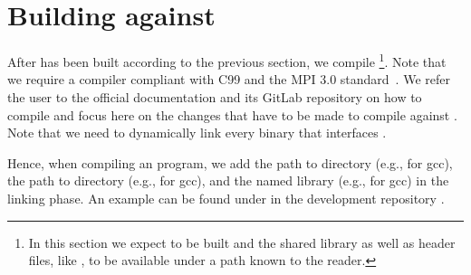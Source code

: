 
\section{Building \openqxd against \quda}
\label{sec:building:openqxd}

After \quda has been built according to the previous section, we compile \openqxd\footnote{In this section we expect \quda to be built and the shared library  as well as header files, like , to be available under a path known to the reader.}.
Note that we require a compiler compliant with C99 and the MPI 3.0 standard~\cite{standard:mpi-3.0}.
We refer the user to the official \openqxd documentation \cite{openqxd} and its GitLab repository \cite{gitlab:openqxd} on how to compile and focus here on the changes that have to be made to compile against \quda.
Note that we need to dynamically link every \openqxd binary that interfaces \quda.


Hence, when compiling an \openqxd program, we add the path to \qudas {} directory (e.g.,  for gcc), the path to \qudas {} directory (e.g.,  for gcc), and the named library (e.g.,  for gcc) in the linking phase. An example  can be found under  in the \openqxd development repository \cite{gitlab:openqxd-devel}.

